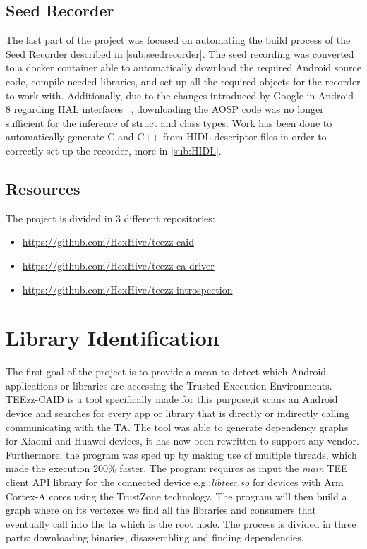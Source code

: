 \documentclass[a4paper,11pt,oneside]{article}
\begin{document}
\subsection{Seed Recorder}
The last part of the project was focused on automating the build process of the Seed Recorder described in \autoref{sub:seedrecorder}.
The seed recording was converted to a docker container able to automatically
download the required Android source code, compile needed libraries, and set up all the
required objects for the recorder to work with. Additionally, due to the changes introduced by Google in Android 8 regarding HAL interfaces ~\cite{HuaweiTrustedCore}, downloading the AOSP code was no longer sufficient for the inference of struct and class types. Work has been done to automatically generate C and C++ from HIDL descriptor files in order to correctly set up the recorder, more in \autoref{sub:HIDL}.

\subsection{Resources}
The project is divided in 3 different repositories:
\begin{itemize}
  \item \href{https://github.com/HexHive/teezz-caid}{https://github.com/HexHive/teezz-caid}
  \item \href{https://github.com/HexHive/teezz-ca-driver}{https://github.com/HexHive/teezz-ca-driver}
  \item \href{https://github.com/HexHive/teezz-introspection}{https://github.com/HexHive/teezz-introspection}
\end{itemize}

\section{Library Identification}
\label{sec:teezz-caid}
The first goal of the project is to provide a mean to detect which Android
applications or libraries are accessing the Trusted Execution Environments.
TEEzz-CAID is a tool specifically made for this purpose,it scans an Android device and searches for every app or library that is directly or
indirectly calling communicating with the TA.
The tool was able to generate dependency graphs for Xiaomi and Huawei devices, it has now been rewritten to support any vendor. Furthermore, the program was sped up by making use of multiple threads, which made the execution 200\% faster.
The program requires as input
the \emph{main} TEE client API library for the connected device e.g.:\emph{libteec.so} for devices with Arm Cortex-A cores using the TrustZone technology.
The program will then build a graph where on its vertexes we find all the
libraries and consumers that eventually call into the ta which is the root node.
The process is divided in three parts:
downloading binaries, disassembling and finding dependencies.
\end{document}
